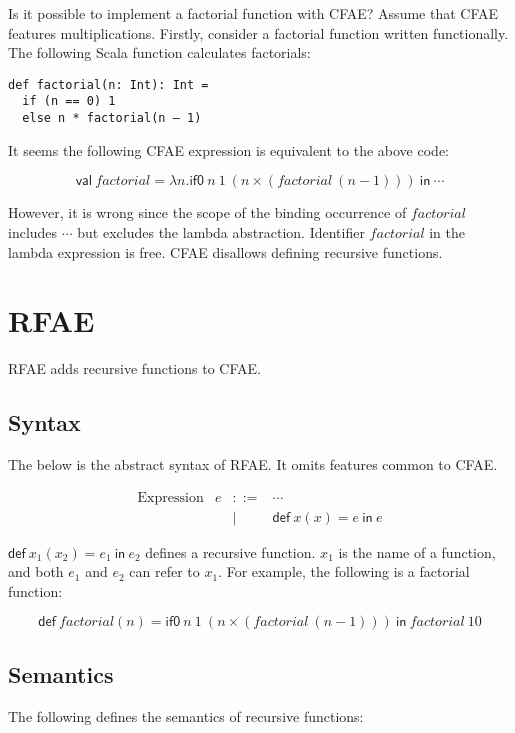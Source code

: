 Is it possible to implement a factorial function with CFAE? Assume that CFAE
features multiplications. Firstly, consider a factorial function written
functionally. The following Scala function calculates factorials:

\begin{verbatim}
def factorial(n: Int): Int =
  if (n == 0) 1
  else n * factorial(n – 1)
\end{verbatim}

It seems the following CFAE expression is equivalent to the above code:

\[\textsf{val}\ factorial=\lambda n.\textsf{if0}\ n\ 1\ (n\times(factorial\
(n-1)))\ \textsf{in}\ \cdots\]

However, it is wrong since the scope of the binding occurrence of \(factorial\)
includes \(\cdots\) but excludes the lambda abstraction. Identifier \(factorial\)
in the lambda expression is free. CFAE disallows defining recursive functions.

\section{RFAE}

RFAE adds recursive functions to CFAE.

\subsection{Syntax}

The below is the abstract syntax of RFAE. It omits features common to CFAE.

\[
\begin{array}{lrcl}
\text{Expression} & e & ::= & \cdots \\
&& | & \textsf{def}\ x(x)=e\ \textsf{in}\ e
\end{array}
\]

\(\textsf{def}\ x_1(x_2)=e_1\ \textsf{in}\ e_2\) defines a recursive function. \(x_1\)
is the name of a function, and both \(e_1\) and \(e_2\) can refer to \(x_1\). For
example, the following is a factorial function:

\[\textsf{def}\ factorial(n)=\textsf{if0}\ n\ 1\ (n\times(factorial\ (n-1)))
\ \textsf{in}\ factorial\ 10\]

\subsection{Semantics}

The following defines the semantics of recursive functions:

